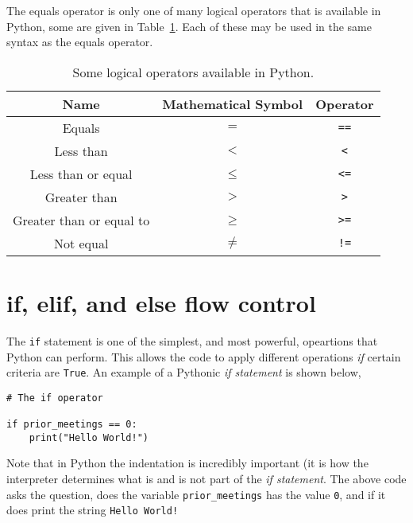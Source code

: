 \documentclass[a4paper]{article}
\begin{document}
The equals operator is only one of many logical operators that is available in Python, some are given in Table~\ref{tab:ops}.
Each of these may be used in the same syntax as the equals operator.
\begin{table}[h]
	\centering
	\caption{Some logical operators available in Python.}
	\label{tab:ops}
	\begin{tabular}{c c c}
		\hline
		Name & Mathematical Symbol & Operator \\
		\hline
		Equals & $=$ &\texttt{==} \\
		Less than & $<$ & \texttt{<} \\
		Less than or equal & $\leq$ & \texttt{<=} \\
		Greater than & $>$ & \texttt{>} \\
		Greater than or equal to & $\geq$ & \texttt{>=} \\
		Not equal & $\neq$ & \texttt{!=}  \\
		\hline
	\end{tabular}
\end{table}
\vspace{\baselineskip}
\begin{center}
	\noindent{}
\end{center}

\section{if, elif, and else flow control}

The \texttt{if} statement is one of the simplest, and most powerful, opeartions that Python can perform. 
This allows the code to apply different operations \emph{if} certain criteria are \texttt{True}.
An example of a Pythonic \emph{if statement} is shown below, 
\begin{lstlisting}
# The if operator

if prior_meetings == 0:
    print("Hello World!")
\end{lstlisting}
Note that in Python the indentation is incredibly important (it is how the interpreter determines what is and is not part of the \emph{if statement}.
The above code asks the question, does the variable \texttt{prior\_meetings} has the value \texttt{0}, and if it does print the string \texttt{Hello World!}
\end{document}
